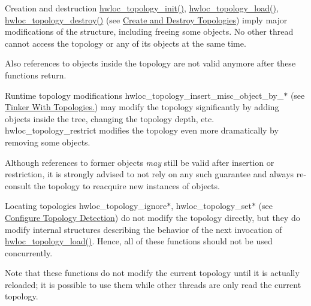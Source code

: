 \begin{DoxyDescription}
\item[Creation and destruction ]{\ttfamily \hyperlink{a00043_ga5c2d6f476af87005c7bd0811d4548b9f}{hwloc\_\-topology\_\-init()}, \hyperlink{a00043_ga91e2e6427b95fb7339c99dbbef996e71}{hwloc\_\-topology\_\-load()}, \hyperlink{a00043_ga6040925d3ee4bbb2647f2a321aca5f4b}{hwloc\_\-topology\_\-destroy()}} (see \hyperlink{a00043}{Create and Destroy Topologies}) imply major modifications of the structure, including freeing some objects. No other thread cannot access the topology or any of its objects at the same time.

Also references to objects inside the topology are not valid anymore after these functions return. 


\item[Runtime topology modifications ]{\ttfamily hwloc\_\-topology\_\-insert\_\-misc\_\-object\_\-by\_\-$\ast$} (see \hyperlink{a00045}{Tinker With Topologies.}) may modify the topology significantly by adding objects inside the tree, changing the topology depth, etc. {\ttfamily hwloc\_\-topology\_\-restrict} modifies the topology even more dramatically by removing some objects.

Although references to former objects {\itshape may\/} still be valid after insertion or restriction, it is strongly advised to not rely on any such guarantee and always re-\/consult the topology to reacquire new instances of objects. 


\item[Locating topologies  ]{\ttfamily hwloc\_\-topology\_\-ignore$\ast$}, {\ttfamily hwloc\_\-topology\_\-set$\ast$} (see \hyperlink{a00044}{Configure Topology Detection}) do not modify the topology directly, but they do modify internal structures describing the behavior of the next invocation of {\ttfamily \hyperlink{a00043_ga91e2e6427b95fb7339c99dbbef996e71}{hwloc\_\-topology\_\-load()}}. Hence, all of these functions should not be used concurrently.

Note that these functions do not modify the current topology until it is actually reloaded; it is possible to use them while other threads are only read the current topology. 


\end{DoxyDescription}